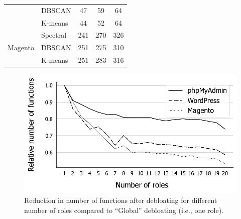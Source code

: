 \begin{table}[t]
\begin{adjustbox}{max width=0.8\columnwidth}
\begin{tabular}{|l|l|lll|}
                                                                                         & DBSCAN                                                                                   & \multicolumn{1}{c|}{47}           & \multicolumn{1}{c|}{59}              & \multicolumn{1}{c|}{64}           \\ \cline{2-5} 
                                                                                         & K-means                                                                                  & \multicolumn{1}{c|}{44}           & \multicolumn{1}{c|}{52}              & \multicolumn{1}{c|}{64}           \\ \hline
    \multirow{3}{*}{Magento}                                                             & Spectral                                                                                 & \multicolumn{1}{c|}{241}          & \multicolumn{1}{c|}{270}             & \multicolumn{1}{c|}{326}          \\ \cline{2-5} 
                                                                                         & DBSCAN                                                                                   & \multicolumn{1}{c|}{251}          & \multicolumn{1}{c|}{275}             & \multicolumn{1}{c|}{310}          \\ \cline{2-5} 
                                                                                         & K-means                                                                                  & \multicolumn{1}{c|}{251}          & \multicolumn{1}{c|}{283}             & \multicolumn{1}{c|}{316}          \\ \hline
\end{tabular}
\end{adjustbox}
\end{table}

\begin{figure}[]
    \centering
    \includegraphics[width=0.8\linewidth]{figures/dbltr/optimalroles_bw.pdf}
    \caption{Reduction in number of functions after debloating for different number of roles compared to ``Global'' debloating (i.e., one role).}
    \label{fig:optimalroles}
\end{figure}

